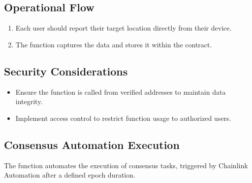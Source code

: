 \documentclass[a4paper,10pt,english]{sphinxmanual}
\begin{document}
\subsection{Operational Flow}
\label{\detokenize{docs_consensus_mechanism_contract:operational-flow}}\begin{enumerate}
%
\item {} 
\sphinxAtStartPar
{} Each user should report their target location directly from their device.

\item {} 
\sphinxAtStartPar
{} The function captures the  data and stores it within the contract.

\end{enumerate}


\subsection{Security Considerations}
\label{\detokenize{docs_consensus_mechanism_contract:id3}}\begin{itemize}
\item {} 
\sphinxAtStartPar
{} Ensure the function is called from verified addresses to maintain data integrity.

\item {} 
\sphinxAtStartPar
{} Implement access control to restrict function usage to authorized users.

\end{itemize}


\subsection{Consensus Automation Execution}
\label{\detokenize{docs_consensus_mechanism_contract:consensus-automation-execution}}
\sphinxAtStartPar
The  function automates the execution of consensus tasks, triggered by Chainlink Automation after a defined epoch duration.

\begin{sphinxVerbatim}[commandchars=\\\{\}]
\end{sphinxVerbatim}
\end{document}
